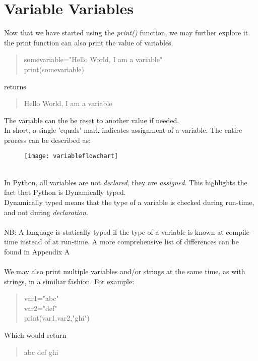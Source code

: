 \section{Variable Variables}
Now that we have started using the \emph{print()} function, we may further explore it.\\
the print function can also print the value of variables.
\begin{quote}
somevariable="Hello World, I am a variable"\\
print(somevariable)
\end{quote}
returns
\begin{quote}
Hello World, I am a variable
\end{quote}
The variable can the be reset to another value if needed.\\ In short, a single 'equals' mark indicates assignment of a variable.
The entire process can be described as: 
\begin{figure}[h]
\texttt{[image: variableflowchart]}
\end{figure}
\\
In Python, all variables are not \emph{declared}, they are \emph{assigned}. This highlights the fact that Python is Dynamically typed.\\ Dynamically typed means that the type of a variable is checked during run-time, and not during \emph{declaration}. \\ \\ 
NB: A language is statically-typed if the type of a variable is known at compile-time instead of at run-time. A more comprehensive list of differences can be found in Appendix A
\\ \\

We may also print multiple variables and/or strings at the same time, as with strings, in a similiar fashion. For example:
\begin{quote}
var1="abc"\\
var2="def"\\
print(var1,var2,"ghi")
\end{quote}

Which would return 
\begin{quote}
abc def ghi
\end{quote}

